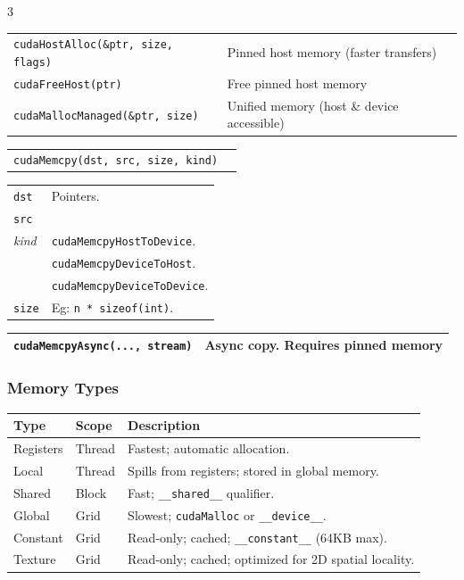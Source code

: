 \begin{multicols*}{3}
\begin{tabularx}{\linewidth}{lX}
\texttt{cudaHostAlloc(\&ptr, size, flags)} & Pinned host memory (faster transfers) \\
\texttt{cudaFreeHost(ptr)} & Free pinned host memory \\
\texttt{cudaMallocManaged(\&ptr, size)} & Unified memory (host \& device accessible) \\
\hline
\end{tabularx}

\begin{tabularx}{\linewidth}{lX}
\texttt{cudaMemcpy(dst, src, size, kind)} &  \\
\end{tabularx}
\begin{tabularx}{\linewidth}{lX}
\texttt{dst}                              & Pointers.\\
\texttt{src}                              & \\
\textit{kind}                             &  \texttt{cudaMemcpyHostToDevice}.\\
                                          &  \texttt{cudaMemcpyDeviceToHost}.\\
                                          &  \texttt{cudaMemcpyDeviceToDevice}.\\
\texttt{size}                             &  Eg: \texttt{n * sizeof(int)}.\\
\hline
\end{tabularx}

\begin{tabularx}{\linewidth}{lX}
\texttt{cudaMemcpyAsync(..., stream)} & Async copy. Requires pinned memory \\
\hline
\end{tabularx}


\subsubsection*{Memory Types}

\begin{tabularx}{\linewidth}{llX}
\hline
\textbf{Type} & \textbf{Scope} & \textbf{Description} \\
\hline
Registers     & Thread   & Fastest; automatic allocation. \\
Local         & Thread   & Spills from registers; stored in global memory. \\
Shared        & Block    & Fast; \texttt{\_\_shared\_\_} qualifier. \\
Global        & Grid     & Slowest; \texttt{cudaMalloc} or \texttt{\_\_device\_\_}. \\
Constant      & Grid     & Read-only; cached; \texttt{\_\_constant\_\_} (64KB max). \\
Texture       & Grid     & Read-only; cached; optimized for 2D spatial locality. \\
\hline
\end{tabularx}



\end{multicols*}
